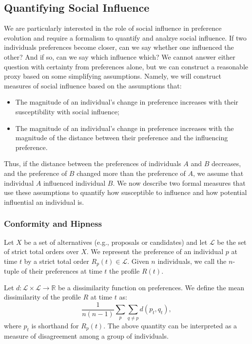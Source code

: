 \subsection{Quantifying Social Influence}

We are particularly interested in the role of social influence in preference evolution and require a formalism to quantify and analzye social influence.
If two individuals preferences become closer, can we say whether one influenced the other? And if so, can we say which influence which?
We cannot answer either question with certainty from preferences alone, but we can construct a reasonable proxy based on some simplifying assumptions.
Namely, we will construct measures of social influence based on the assumptions that:
\begin{itemize}
    \item The magnitude of an individual's change in preference increases with their susceptibility with social influence;
    \item The magnitude of an individual's change in preference increases with the magnitude of the distance between their preference and the influencing preference.
\end{itemize}
Thus, if the distance between the preferences of individuals $A$ and $B$ decreases, and the preference of $B$ changed more than the preference of $A$, we assume that individual $A$ influenced individual $B$.
We now describe two formal measures that use these assumptions to quantify how susceptible to influence and how potential influential an individual is.

\subsubsection{Conformity and Hipness}

Let $X$ be a set of alternatives (e.g., proposals or candidates)
and let $\mathcal{L}$ be the set of strict total orders over $X$.
We represent the preference of an individual $p$ at time $t$
by a strict total order $R_p(t) \in \mathcal{L}$.
Given $n$ individuals, we call the $n$-tuple of their preferences
at time $t$ the profile $R(t)$.

Let $d:\mathcal{L}\times\mathcal{L} \to \mathbb{R}$ be a
dissimilarity function on preferences.
We define the mean dissimilarity of the profile $R$ at time $t$ as:
\begin{equation}
    \frac{1}{n(n-1)} \sum_p \sum_{q \neq p} d\left(p_t, q_t\right),
\end{equation}
where $p_t$ is shorthand for $R_p(t)$.
The above quantity can be interpreted as a measure of disagreement among a group of individuals.

